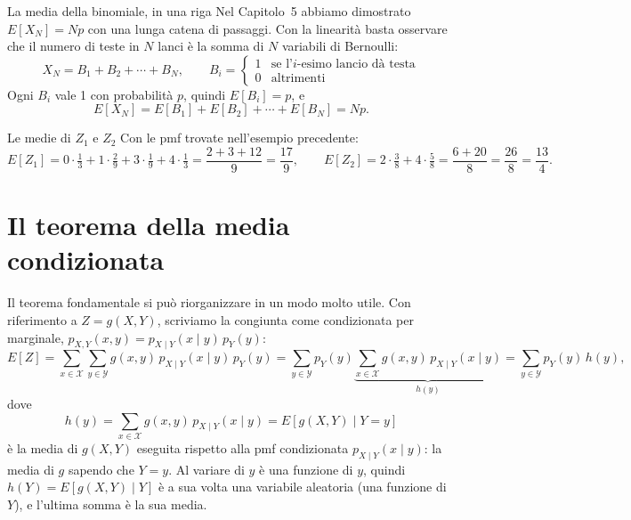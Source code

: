 
\begin{esempio}{La media della binomiale, in una riga}
Nel Capitolo~5 abbiamo dimostrato $E[X_N] = Np$ con una lunga catena di passaggi. Con la linearità basta osservare che
il numero di teste in $N$ lanci è la somma di $N$ variabili di Bernoulli:
\[ X_N = B_1 + B_2 + \cdots + B_N , \qquad B_i = \begin{cases} 1 & \text{se l'$i$-esimo lancio dà testa} \\
   0 & \text{altrimenti} \end{cases} \]
Ogni $B_i$ vale 1 con probabilità $p$, quindi $E[B_i] = p$, e
\[ E[X_N] = E[B_1] + E[B_2] + \cdots + E[B_N] = N p . \]
\end{esempio}

\begin{esempio}{Le medie di $Z_1$ e $Z_2$}
Con le pmf trovate nell'esempio precedente:
\[
  E[Z_1] = 0 \cdot \tfrac13 + 1 \cdot \tfrac29 + 3 \cdot \tfrac19 + 4 \cdot \tfrac13 = \frac{2 + 3 + 12}{9} =
  \frac{17}{9} , \qquad
  E[Z_2] = 2 \cdot \tfrac38 + 4 \cdot \tfrac58 = \frac{6 + 20}{8} = \frac{26}{8} = \frac{13}{4} .
\]
\end{esempio}

\section{Il teorema della media condizionata}

Il teorema fondamentale si può riorganizzare in un modo molto utile. Con riferimento a $Z = g(X, Y)$, scriviamo la
congiunta come condizionata per marginale, $p_{X,Y}(x, y) = p_{X \mid Y}(x \mid y)\, p_Y(y)$:
\[
  E[Z] = \sum_{x \in \mathcal{X}} \sum_{y \in \mathcal{Y}} g(x, y)\, p_{X \mid Y}(x \mid y)\, p_Y(y)
  = \sum_{y \in \mathcal{Y}} p_Y(y) \underbrace{\sum_{x \in \mathcal{X}} g(x, y)\, p_{X \mid Y}(x \mid y)}_{h(y)}
  = \sum_{y \in \mathcal{Y}} p_Y(y)\, h(y) ,
\]
dove
\[ h(y) = \sum_{x \in \mathcal{X}} g(x, y)\, p_{X \mid Y}(x \mid y) = E[g(X, Y) \mid Y = y] \]
è la media di $g(X, Y)$ eseguita rispetto alla pmf condizionata $p_{X \mid Y}(x \mid y)$: la media di $g$ sapendo che
$Y = y$. Al variare di $y$ è una funzione di $y$, quindi $h(Y) = E[g(X, Y) \mid Y]$ è a sua volta una variabile
aleatoria (una funzione di $Y$), e l'ultima somma è la sua media.


